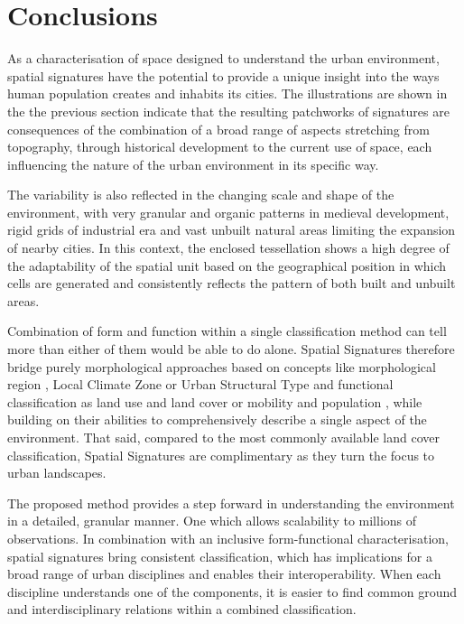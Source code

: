 \section{Conclusions}
\label{sec:conclusions}

As a characterisation of space designed to understand the urban environment, spatial
signatures have the potential to provide a unique insight into the ways human population
creates and inhabits its cities. The illustrations are shown in the the previous section
indicate that the resulting patchworks of signatures are consequences of the combination
of a broad range of aspects stretching from topography, through historical development
to the current use of space, each influencing the nature of the urban environment in its
specific way.

The variability is also reflected in the changing scale and shape of the environment,
with very granular and organic patterns in medieval development, rigid grids of
industrial era and vast unbuilt natural areas limiting the expansion of nearby cities.
In this context, the enclosed tessellation shows a high degree of the adaptability of
the spatial unit based on the geographical position in which cells are generated and
consistently reflects the pattern of both built and unbuilt areas.

Combination of form and function within a single classification method can tell more
than either of them would be able to do alone. Spatial Signatures therefore bridge
purely morphological approaches based on concepts like morphological region
\citep{oliveira2020}, Local Climate Zone \citep{stewart2012} or Urban Structural Type
\citep{lehner2019} and functional classification as land use and land cover
\citep{georganos2018very} or mobility and population \citep{gale2016creating}, while
building on their abilities to comprehensively describe a single aspect of the
environment. That said, compared to the most commonly available land cover
classification, Spatial Signatures are complimentary as they turn the focus to urban
landscapes.

The proposed method provides a step forward in understanding the environment in a
detailed, granular manner. One which allows scalability to millions of observations. In
combination with an inclusive form-functional characterisation, spatial signatures bring
consistent classification, which has implications for a broad range of urban disciplines
and enables their interoperability. When each discipline understands one of the
components, it is easier to find common ground and interdisciplinary relations within a
combined classification.

